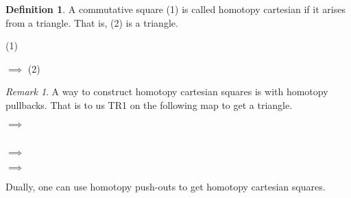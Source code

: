 \documentclass[12pt]{article}
\theoremstyle{definition}
\newtheorem{definition}{Definition}[section]
\theoremstyle{remark}
\newtheorem*{remark}{Remark}
\begin{document}
            \begin{definition}
                A commutative square (1) is called homotopy cartesian if it arises from a triangle. That is, (2) is a triangle.
                \begin{center}
                    (1)
                    $\implies$
                    (2)
                \end{center}
            \end{definition}
                
            \begin{remark}
                A way to construct homotopy cartesian squares is with homotopy pullbacks. That is to us TR1 on the following map to get a triangle.
                \begin{center}
                    $\implies$
                     \\
                    $\implies$
                    $\implies$
                \end{center}

                Dually, one can use homotopy push-outs to get homotopy cartesian squares.
            \end{remark}
\end{document}
